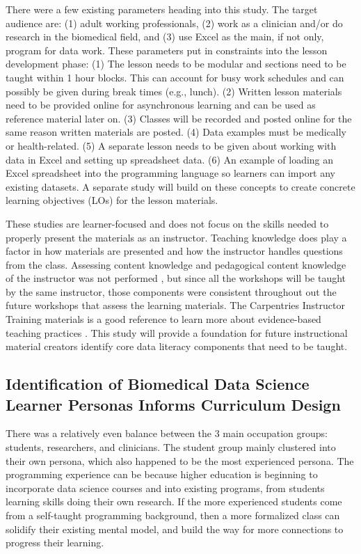 \documentclass[020-persona\_validation.tex]{subfiles}
\begin{document}
    There were a few existing parameters heading into this study.
    The target audience are:
    (1) adult working professionals,
    (2) work as a clinician and/or do research in the biomedical field, and
    (3) use Excel as the main, if not only, program for data work.
    These parameters put in constraints into the lesson development phase:
    (1) The lesson needs to be modular and sections need to be taught within 1 hour blocks.
    This can account for busy work schedules and can possibly be given during break times (e.g., lunch).
    (2) Written lesson materials need to be provided online for asynchronous learning and can be used as reference material later on.
    (3) Classes will be recorded and posted online for the same reason written materials are posted.
    (4) Data examples must be medically or health-related.
    (5) A separate lesson needs to be given about working with data in Excel and setting up spreadsheet data.
    (6) An example of loading an Excel spreadsheet into the programming language so learners can import any existing datasets.
    A separate study will build on these concepts to create concrete learning objectives (LOs) for the lesson materials.

    These studies are learner-focused and does not focus on the skills needed to properly present the materials as an instructor.
    Teaching knowledge does play a factor in how materials are presented and how the instructor handles questions from the class.
    Assessing content knowledge and pedagogical content knowledge of the instructor was not performed
    \cite{shulmanThoseWhoUnderstand1986},
    but since all the workshops will be taught by the same instructor, those components were consistent throughout out
    the future workshops that assess the learning materials.
    The Carpentries Instructor Training materials is a good reference to learn more about evidence-based teaching practices
    \cite{Koch2016}.
    This study will provide a foundation for future instructional material creators identify core data literacy components
    that need to be taught.

    \subsection{Identification of Biomedical Data Science Learner Personas Informs Curriculum Design}

        There was a relatively even balance between the 3 main occupation groups: students, researchers, and clinicians.
        The student group mainly clustered into their own persona,
        which also happened to be the most experienced persona.
        The programming experience can be because higher education is beginning to incorporate data science courses and
        into existing programs,
        from students learning skills doing their own research.
        If the more experienced students come from a self-taught programming background,
        then a more formalized class can solidify their existing mental model,
        and build the way for more connections to progress their learning.
\end{document}
